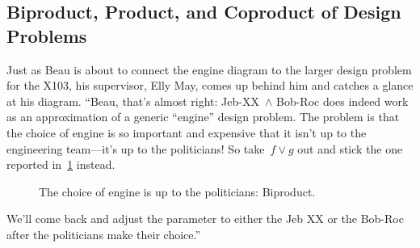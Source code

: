 \subsection{Biproduct, Product, and Coproduct of Design Problems}
\begin{example}
Just as Beau is about to connect the engine diagram to the larger design problem for the X103, his supervisor, Elly May, comes up behind him and catches a glance at his diagram. ``Beau, that's almost right: Jeb-XX~$\wedge$ Bob-Roc does indeed work as an approximation of a generic ``engine'' design problem. The problem is that the choice of engine is so important and expensive that it isn't up to the engineering team---it's up to the politicians! So take~$f \vee g$ out and stick the one reported in~\cref{fig:exbiproduct} instead.
\begin{figure}[h!]
\begin{center}
\end{center}
\caption{The choice of engine is up to the politicians: Biproduct. \label{fig:exbiproduct}}
\end{figure}

We'll come back and adjust the parameter to either the Jeb XX or the Bob-Roc after the politicians make their choice.''
\end{example}
